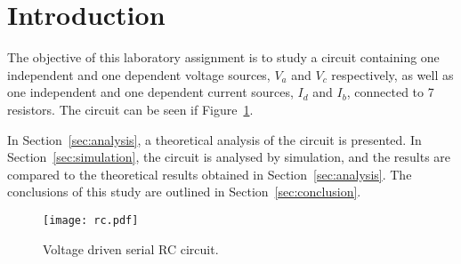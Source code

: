 \section{Introduction}
\label{sec:introduction}

The objective of this laboratory assignment is to study a circuit containing one independent and one dependent voltage sources, $V_a$ and $V_c$ respectively, as well as one independent and one dependent current sources, $I_d$ and $I_b$, connected to 7 resistors. The circuit can be seen if Figure~\ref{fig:rc}.

\lipsum[1-1]

In Section~\ref{sec:analysis}, a theoretical analysis of the circuit is
presented. In Section~\ref{sec:simulation}, the circuit is analysed by
simulation, and the results are compared to the theoretical results obtained in
Section~\ref{sec:analysis}. The conclusions of this study are outlined in
Section~\ref{sec:conclusion}.

\begin{figure}[h] \centering
\texttt{[image: rc.pdf]}
\caption{Voltage driven serial RC circuit.}
\label{fig:rc}
\end{figure}

